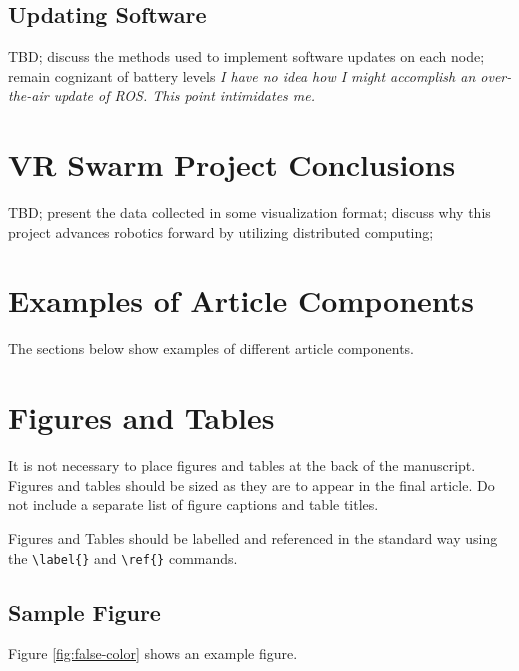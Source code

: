 \documentclass[9pt,twocolumn,twoside]{styles/osajnl}
\begin{document}
\subsection{Updating Software}
TBD; discuss the methods used to implement software updates on each node; remain cognizant of battery levels
\textit{I have no idea how I might accomplish an over-the-air update of ROS.  This point intimidates me.}

\section{VR Swarm Project Conclusions}
TBD; present the data collected in some visualization format; discuss why this project advances robotics forward by utilizing distributed computing;

\section{Examples of Article Components}
\label{sec:examples}

The sections below show examples of different article components.

\section{Figures and Tables}

It is not necessary to place figures and tables at the back of the
manuscript. Figures and tables should be sized as they are to appear
in the final article. Do not include a separate list of figure
captions and table titles.

Figures and Tables should be labelled and referenced in the standard
way using the \verb|\label{}| and \verb|\ref{}| commands.

\subsection{Sample Figure}

Figure \ref{fig:false-color} shows an example figure.
\end{document}
